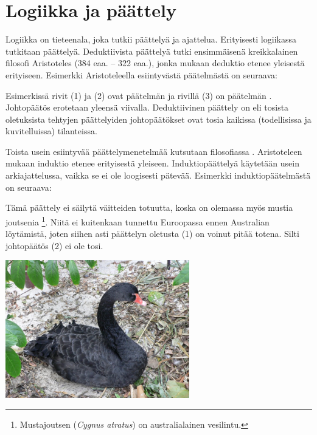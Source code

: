 \chapter{Logiikka ja päättely}

Logiikka on tieteenala, joka tutkii päättelyä ja ajattelua.
Erityisesti logiikassa tutkitaan  päättelyä.
Deduktiivista päättelyä tutki ensimmäisenä kreikkalainen filosofi Aristoteles (384 eaa. -- 322 eaa.),
jonka mukaan deduktio etenee yleisestä erityiseen.
Esimerkki Aristoteleella esiintyvästä pää\-tel\-mäs\-tä on seuraava:

\bigskip
\begin{center}
\end{center}
\bigskip

Esimerkissä rivit (1) ja (2) ovat päätelmän  ja
rivillä (3) on päätelmän .
Johtopäätös erotetaan yleensä viivalla.
Deduktiivinen päättely on  eli
tosista oletuksista tehtyjen päättelyiden johtopäätökset ovat tosia kaikissa
(todellisissa ja kuvitelluissa) tilanteissa.

Toista usein esiintyvää päättelymenetelmää kutsutaan filosofiassa
.
Aristoteleen mukaan induktio etenee erityisestä yleiseen.
Induktiopäättelyä käytetään usein arkiajattelussa, vaikka se ei
ole loogisesti pätevää.
Esimerkki induktiopäätelmästä on seuraava:

\bigskip
\begin{center}
\end{center}
\bigskip

Tämä päättely ei säilytä väitteiden totuutta, koska on olemassa myös mustia joutsenia
\footnote{Mustajoutsen ({\it Cygnus atratus}) on australialainen vesilintu.}.
Niitä ei kuitenkaan tunnettu Euroopassa ennen Australian löytämistä, joten
siihen asti päättelyn oletusta (1) on voinut pitää totena.
Silti johtopäätös (2) ei ole tosi.

\bigskip
\begin{center}
    \includegraphics[width=8cm]{pictures/kuvitus/Cygnus_atratus1}
\end{center}
\bigskip

